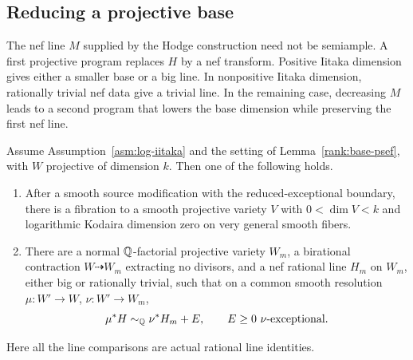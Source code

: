 

\subsection{Reducing a projective base}

The nef line \(M\) supplied by the Hodge construction need not be
semiample.  A first projective program replaces \(H\) by a nef transform.
Positive Iitaka dimension gives either a smaller base or a big line.  In
nonpositive Iitaka dimension, rationally trivial nef data give a trivial
line.  In the remaining case,
decreasing \(M\) leads to a second program that lowers the base dimension
while preserving the first nef line.

\begin{lemma}
\label{rank:base-reduction}
Assume Assumption~\ref{asm:log-iitaka} and the setting of
Lemma~\ref{rank:base-psef}, with \(W\) projective of dimension \(k\).
Then one of the following holds.
\begin{enumerate}
\item After a smooth source modification with the reduced-exceptional
boundary, there is a fibration to a smooth projective variety \(V\)
with \(0<\dim V<k\) and logarithmic Kodaira dimension zero on very
general smooth fibers.
\item There are a normal \(\mathbb Q\)-factorial projective variety \(W_m\),
a birational contraction \(W\dashrightarrow W_m\) extracting no
divisors, and a nef rational line \(H_m\) on \(W_m\), either big or
rationally trivial, such that on a common smooth resolution
\(\mu:W'\to W\), \(\nu:W'\to W_m\),
\begin{equation}
             \mu^*H\sim_{\mathbb Q}\nu^*H_m+E,
             \qquad E\geq0\ \text{\(\nu\)-exceptional}.
\label{rank:base-endpoint}
\end{equation}
\end{enumerate}
Here all the line comparisons are actual rational line identities.
\end{lemma}

